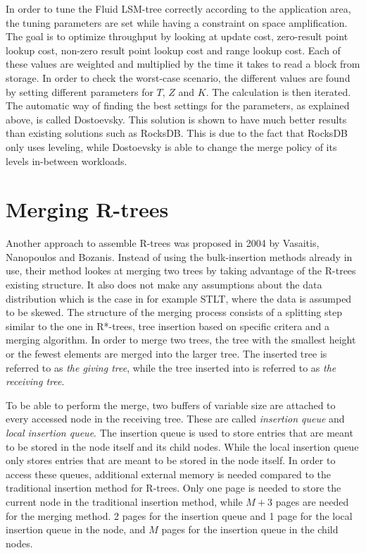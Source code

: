 In order to tune the Fluid LSM-tree correctly according to the application area, the tuning parameters are set while having a constraint on space amplification. The goal is to optimize throughput by looking at update cost, zero-result point lookup cost, non-zero result point lookup cost and range lookup cost. Each of these values are weighted and multiplied by the time it takes to read a block from storage. In order to check the worst-case scenario, the different values are found by setting different parameters for $T$, $Z$ and $K$. The calculation is then iterated. The automatic way of finding the best settings for the parameters, as explained above, is called Dostoevsky. This solution is shown to have much better results than existing solutions such as RocksDB\cite{Dostoevsky}. This is due to the fact that RocksDB only uses leveling, while Dostoevsky is able to change the merge policy of its levels in-between workloads.

\section{Merging R-trees}
Another approach to assemble R-trees was proposed in 2004 by Vasaitis, Nanopoulos and Bozanis\cite{MergingRtree}. Instead of using the bulk-insertion methods already in use, their method lookes at merging two trees by taking advantage of the R-trees existing structure. It also does not make any assumptions about the data distribution which is the case in for example STLT, where the data is assumped to be skewed\cite{STLT}. The structure of the merging process consists of a splitting step similar to the one in R*-trees, tree insertion based on specific critera and a merging algorithm. In order to merge two trees, the tree with the smallest height or the fewest elements are merged into the larger tree. The inserted tree is referred to as \emph{the giving tree}, while the tree inserted into is referred to as \emph{the receiving tree}. \newline

To be able to perform the merge, two buffers of variable size are attached to every accessed node in the receiving tree. These are called \emph{insertion queue} and \emph{local insertion queue}. The insertion queue is used to store entries that are meant to be stored in the node itself and its child nodes. While the local insertion queue only stores entries that are meant to be stored in the node itself. In order to access these queues, additional external memory is needed compared to the traditional insertion method for R-trees. Only one page is needed to store the current node in the traditional insertion method, while $M+3$ pages are needed for the merging method. 2 pages for the insertion queue and 1 page for the local insertion queue in the node, and $M$ pages for the insertion queue in the child nodes.\newline

